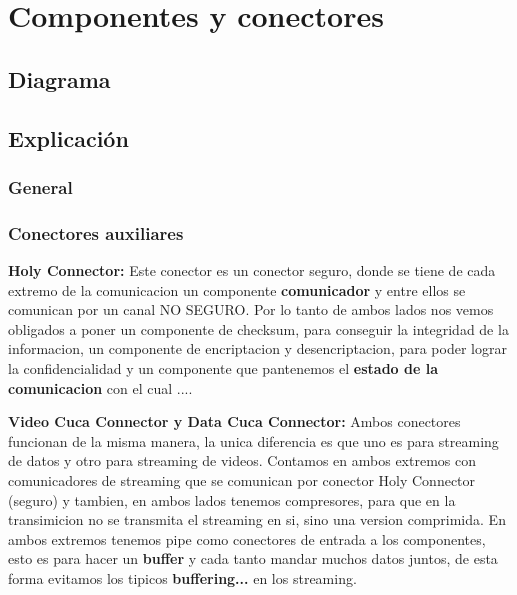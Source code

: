 \section{Componentes y conectores}
\subsection{Diagrama}
\subsection{Explicación}
\subsubsection{General}
\subsubsection{Conectores auxiliares}
\textbf{Holy Connector:}
Este conector es un conector seguro, donde se tiene de cada extremo de la comunicacion un componente \textbf{comunicador} y entre ellos se comunican por un canal NO SEGURO. 
Por lo tanto de ambos lados nos vemos obligados a poner un componente de checksum, para conseguir la integridad de la informacion, un componente de encriptacion y desencriptacion, para poder lograr la confidencialidad y un componente que pantenemos el \textbf{estado de la comunicacion} con el cual ....


\textbf{Video Cuca Connector y Data Cuca Connector:} 
Ambos conectores funcionan de la misma manera, la unica diferencia es que uno es para streaming de datos y otro para streaming de videos. 
Contamos en ambos extremos con comunicadores de streaming que se comunican por conector Holy Connector (seguro) y tambien, en ambos lados tenemos compresores, para que en la transimicion no se transmita el streaming en si, sino una version comprimida.
En ambos extremos tenemos pipe como conectores de entrada a los componentes, esto es para hacer un \textbf{buffer} y cada tanto mandar muchos datos juntos, de esta forma evitamos los tipicos \textbf{buffering...} en los streaming.
